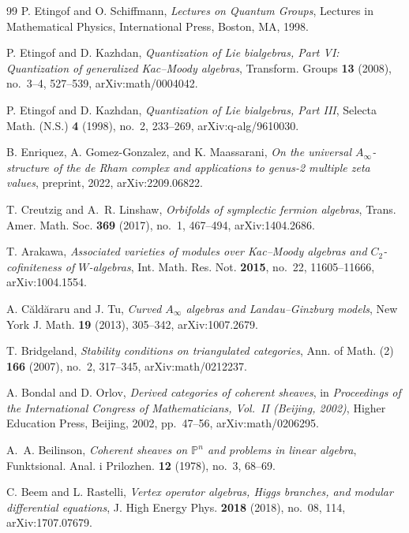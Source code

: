 \begin{thebibliography}{99}
P. Etingof and O. Schiffmann, \emph{Lectures on Quantum Groups}, Lectures in Mathematical Physics, International Press, Boston, MA, 1998.

P. Etingof and D. Kazhdan, \emph{Quantization of Lie bialgebras, Part VI: Quantization of generalized Kac--Moody algebras}, Transform. Groups \textbf{13} (2008), no.~3--4, 527--539, arXiv:math/0004042.

P. Etingof and D. Kazhdan, \emph{Quantization of Lie bialgebras, Part III}, Selecta Math. (N.S.) \textbf{4} (1998), no.~2, 233--269, arXiv:q-alg/9610030.

B. Enriquez, A. Gomez-Gonzalez, and K. Maassarani, \emph{On the universal $A_\infty$-structure of the de Rham complex and applications to genus-2 multiple zeta values}, preprint, 2022, arXiv:2209.06822.

T. Creutzig and A.~R. Linshaw, \emph{Orbifolds of symplectic fermion algebras}, Trans. Amer. Math. Soc. \textbf{369} (2017), no.~1, 467--494, arXiv:1404.2686.

T. Arakawa, \emph{Associated varieties of modules over Kac--Moody algebras and $C_2$-cofiniteness of $W$-algebras}, Int. Math. Res. Not. \textbf{2015}, no.~22, 11605--11666, arXiv:1004.1554.

A. C{\u a}ld{\u a}raru and J. Tu, \emph{Curved $A_\infty$ algebras and Landau--Ginzburg models}, New York J. Math. \textbf{19} (2013), 305--342, arXiv:1007.2679.

T. Bridgeland, \emph{Stability conditions on triangulated categories}, Ann. of Math. (2) \textbf{166} (2007), no.~2, 317--345, arXiv:math/0212237.

A. Bondal and D. Orlov, \emph{Derived categories of coherent sheaves}, in \emph{Proceedings of the International Congress of Mathematicians, Vol.\ II (Beijing, 2002)}, Higher Education Press, Beijing, 2002, pp.~47--56, arXiv:math/0206295.

A.~A. Beilinson, \emph{Coherent sheaves on $\mathbb{P}^n$ and problems in linear algebra}, Funktsional. Anal. i Prilozhen. \textbf{12} (1978), no.~3, 68--69.

C. Beem and L. Rastelli, \emph{Vertex operator algebras, Higgs branches, and modular differential equations}, J. High Energy Phys. \textbf{2018} (2018), no.~08, 114, arXiv:1707.07679.


\end{thebibliography}
